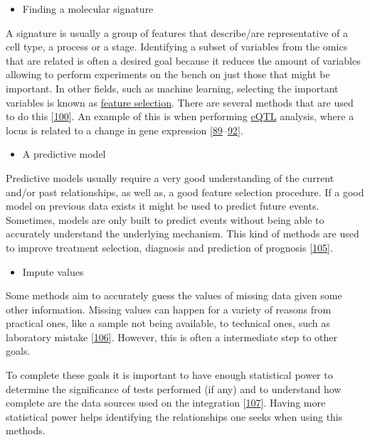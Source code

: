 \documentclass[
  12pt,
  a4paper,
  twoside,
  openright]{book}
\providecommand{\tightlist}{%
  \setlength{\itemsep}{0pt}\setlength{\parskip}{0pt}}
\begin{document}
\begin{itemize}
\tightlist
\item
  Finding a molecular signature
\end{itemize}

A signature is usually a group of features that describe/are representative of a cell type, a process or a stage.
Identifying a subset of variables from the omics that are related is often a desired goal because it reduces the amount of variables allowing to perform experiments on the bench on just those that might be important.
In other fields, such as machine learning, selecting the important variables is known as \href{https://en.wikipedia.org/wiki/Feature_selection}{feature selection}.
There are several methods that are used to do this {[}\protect\hyperlink{ref-cavill2016}{100}{]}.
An example of this is when performing \protect\hyperlink{acronyms_eQTL}{eQTL} analysis, where a locus is related to a change in gene expression {[}\protect\hyperlink{ref-repnik2016}{89}--\protect\hyperlink{ref-dai2019}{92}{]}.

\begin{itemize}
\tightlist
\item
  A predictive model
\end{itemize}

Predictive models usually require a very good understanding of the current and/or past relationships, as well as, a good feature selection procedure.
If a good model on previous data exists it might be used to predict future events.
Sometimes, models are only built to predict events without being able to accurately understand the underlying mechanism.
This kind of methods are used to improve treatment selection, diagnosis and prediction of prognosis {[}\protect\hyperlink{ref-wheeler2014}{105}{]}.

\begin{itemize}
\tightlist
\item
  Impute values
\end{itemize}

Some methods aim to accurately guess the values of missing data given some other information.
Missing values can happen for a variety of reasons from practical ones, like a sample not being available, to technical ones, such as laboratory mistake {[}\protect\hyperlink{ref-yin2019}{106}{]}.
However, this is often a intermediate step to other goals.

To complete these goals it is important to have enough statistical power to determine the significance of tests performed (if any) and to understand how complete are the data sources used on the integration {[}\protect\hyperlink{ref-tarazona2021}{107}{]}.
Having more statistical power helps identifying the relationships one seeks when using this methods.
\end{document}
